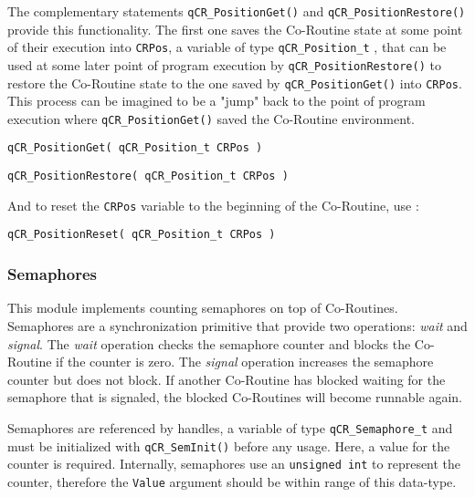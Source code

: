 The complementary statements \lstinline{qCR_PositionGet()}  and \lstinline{qCR_PositionRestore()}  provide this functionality.
The first one saves the Co-Routine state at some point of their execution into \lstinline{CRPos}, a variable of type \lstinline{qCR_Position_t} ,  that can be used at some later point of program execution by \lstinline{qCR_PositionRestore()} to restore the Co-Routine  state to the one saved by \lstinline{qCR_PositionGet()} into \lstinline{CRPos}. This process can be imagined to be a "jump" back to the point of program execution where \lstinline{qCR_PositionGet()} saved the Co-Routine  environment.
\medskip

\begin{lstlisting}[style=CStyle]
qCR_PositionGet( qCR_Position_t CRPos )
\end{lstlisting}

\begin{lstlisting}[style=CStyle]
qCR_PositionRestore( qCR_Position_t CRPos )
\end{lstlisting}

And to reset the \lstinline{CRPos} variable to the beginning of the Co-Routine, use :

\begin{lstlisting}[style=CStyle]
qCR_PositionReset( qCR_Position_t CRPos )
\end{lstlisting}

\subsubsection{Semaphores}
This module implements counting semaphores on top of Co-Routines. Semaphores are a synchronization primitive that provide two operations: \textit{wait} and \textit{signal}. The \textit{wait} operation checks the semaphore counter and blocks the Co-Routine if the counter is zero. The \textit{signal} operation increases the semaphore counter but does not block. If another Co-Routine has blocked waiting for the semaphore that is signaled, the blocked Co-Routines will become runnable again.

Semaphores are referenced by handles, a variable of type \lstinline{qCR_Semaphore_t} and must be initialized with \lstinline{qCR_SemInit()}  before any usage.  Here, a value for the counter is required. Internally, semaphores use an \lstinline{unsigned int} to represent the counter, therefore the \lstinline{Value} argument should be within range of this data-type.
\medskip

